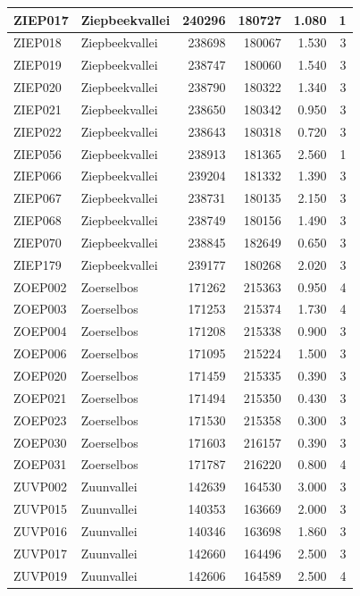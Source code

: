 \documentclass[11pt,]{book}
\begin{document}
\begin{table}
\begin{tabular}[t]{l|l|r|r|r|r}
\hline
ZIEP017 & Ziepbeekvallei & 240296 & 180727 & 1.080 & 1\\
\hline
ZIEP018 & Ziepbeekvallei & 238698 & 180067 & 1.530 & 3\\
\hline
ZIEP019 & Ziepbeekvallei & 238747 & 180060 & 1.540 & 3\\
\hline
ZIEP020 & Ziepbeekvallei & 238790 & 180322 & 1.340 & 3\\
\hline
ZIEP021 & Ziepbeekvallei & 238650 & 180342 & 0.950 & 3\\
\hline
ZIEP022 & Ziepbeekvallei & 238643 & 180318 & 0.720 & 3\\
\hline
ZIEP056 & Ziepbeekvallei & 238913 & 181365 & 2.560 & 1\\
\hline
ZIEP066 & Ziepbeekvallei & 239204 & 181332 & 1.390 & 3\\
\hline
ZIEP067 & Ziepbeekvallei & 238731 & 180135 & 2.150 & 3\\
\hline
ZIEP068 & Ziepbeekvallei & 238749 & 180156 & 1.490 & 3\\
\hline
ZIEP070 & Ziepbeekvallei & 238845 & 182649 & 0.650 & 3\\
\hline
ZIEP179 & Ziepbeekvallei & 239177 & 180268 & 2.020 & 3\\
\hline
ZOEP002 & Zoerselbos & 171262 & 215363 & 0.950 & 4\\
\hline
ZOEP003 & Zoerselbos & 171253 & 215374 & 1.730 & 4\\
\hline
ZOEP004 & Zoerselbos & 171208 & 215338 & 0.900 & 3\\
\hline
ZOEP006 & Zoerselbos & 171095 & 215224 & 1.500 & 3\\
\hline
ZOEP020 & Zoerselbos & 171459 & 215335 & 0.390 & 3\\
\hline
ZOEP021 & Zoerselbos & 171494 & 215350 & 0.430 & 3\\
\hline
ZOEP023 & Zoerselbos & 171530 & 215358 & 0.300 & 3\\
\hline
ZOEP030 & Zoerselbos & 171603 & 216157 & 0.390 & 3\\
\hline
ZOEP031 & Zoerselbos & 171787 & 216220 & 0.800 & 4\\
\hline
ZUVP002 & Zuunvallei & 142639 & 164530 & 3.000 & 3\\
\hline
ZUVP015 & Zuunvallei & 140353 & 163669 & 2.000 & 3\\
\hline
ZUVP016 & Zuunvallei & 140346 & 163698 & 1.860 & 3\\
\hline
ZUVP017 & Zuunvallei & 142660 & 164496 & 2.500 & 3\\
\hline
ZUVP019 & Zuunvallei & 142606 & 164589 & 2.500 & 4\\

\end{tabular}
\end{table}
\end{document}
